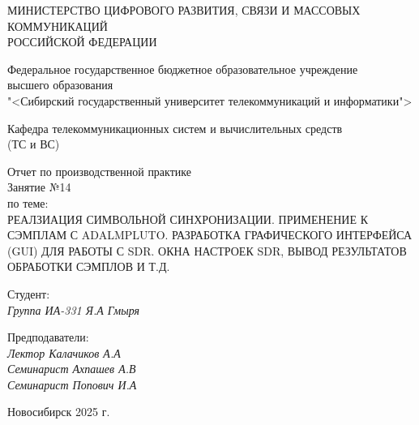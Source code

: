 \thispagestyle{empty}

\begin{center}
    МИНИСТЕРСТВО ЦИФРОВОГО РАЗВИТИЯ, СВЯЗИ И МАССОВЫХ КОММУНИКАЦИЙ \\ РОССИЙСКОЙ ФЕДЕРАЦИИ

    \vspace{20pt}

    Федеральное государственное бюджетное образовательное учреждение  \\  высшего образования \\
    "<Сибирский государственный университет телекоммуникаций и информатики"> \\

    \vspace{20pt}

    Кафедра телекоммуникационных систем и вычислительных средств \\  (ТС и ВС)
\end{center}

\vfill

\begin{center}
    Отчет по производственной практике \\  
    Занятие №14 \\

    \vspace{20pt}
    по теме: \\
    \uppercase{Реалзиация символьной синхронизации. Применение к сэмплам с AdalmPluto.
Разработка графического интерфейса (GUI) для работы с SDR. Окна настроек SDR, вывод результатов обработки сэмплов и т.д.}
\end{center}

\vfill

    \noindent Студент: \\
    \textit{Группа ИА-331 \hfill Я.А Гмыря}

    \vspace{20pt}

    \noindent Предподаватели: \\
    \textit{Лектор \hfill Калачиков А.А} \\
    \textit{Семинарист \hfill Ахпашев А.В} \\
    \textit{Семинарист \hfill Попович И.А}

\vfill

\begin{center}
    Новосибирск 2025 г.
\end{center}